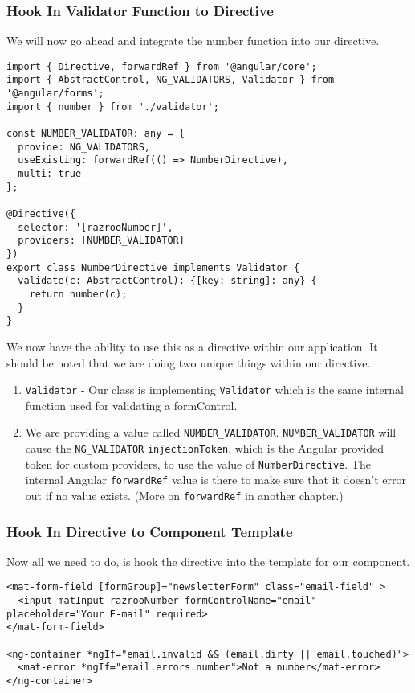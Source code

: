 \subsubsection{Hook In Validator Function to Directive}
We will now go ahead and integrate the number function into our directive. 

\begin{lstlisting}[caption=number.directive.ts]
import { Directive, forwardRef } from '@angular/core';
import { AbstractControl, NG_VALIDATORS, Validator } from '@angular/forms';
import { number } from './validator';

const NUMBER_VALIDATOR: any = {
  provide: NG_VALIDATORS,
  useExisting: forwardRef(() => NumberDirective),
  multi: true
};

@Directive({
  selector: '[razrooNumber]',
  providers: [NUMBER_VALIDATOR]
})
export class NumberDirective implements Validator {
  validate(c: AbstractControl): {[key: string]: any} {
    return number(c);
  }
}  
\end{lstlisting}

We now have the ability to use this as a directive within our application. It should be noted that we are doing two unique things within our directive. 
\begin{enumerate}
  \item \lstinline{Validator} -  Our class is implementing \lstinline{Validator}
  which is the same internal function used for validating a formControl. 
  \item We are providing a value called \lstinline{NUMBER_VALIDATOR}. 
  \lstinline{NUMBER_VALIDATOR} will cause the \lstinline{NG_VALIDATOR} 
  \lstinline{injectionToken}, which is the Angular provided token 
  for custom providers, to use the value of \lstinline{NumberDirective}.
  The internal Angular \lstinline{forwardRef} value is there to make sure 
  that it doesn't error out if no value exists. (More on \lstinline{forwardRef}
  in another chapter.)
\end{enumerate}

\subsubsection{Hook In Directive to Component Template}
Now all we need to do, is hook the directive into the template for our 
component. 

\begin{lstlisting}[caption=newsletter.component.html]
<mat-form-field [formGroup]="newsletterForm" class="email-field" >
  <input matInput razrooNumber formControlName="email" placeholder="Your E-mail" required>
</mat-form-field>

<ng-container *ngIf="email.invalid && (email.dirty || email.touched)">
  <mat-error *ngIf="email.errors.number">Not a number</mat-error>
</ng-container>
\end{lstlisting}

